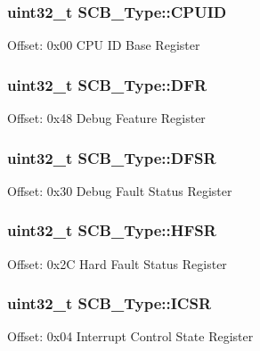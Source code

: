 \subsubsection[{\texorpdfstring{C\+P\+U\+ID}{CPUID}}]{ uint32\+\_\+t S\+C\+B\+\_\+\+Type\+::\+C\+P\+U\+ID}\hypertarget{structSCB__Type_afa7a9ee34dfa1da0b60b4525da285032}{}\label{structSCB__Type_afa7a9ee34dfa1da0b60b4525da285032}
Offset\+: 0x00 C\+PU ID Base Register 
\subsubsection[{\texorpdfstring{D\+FR}{DFR}}]{ uint32\+\_\+t S\+C\+B\+\_\+\+Type\+::\+D\+FR}\hypertarget{structSCB__Type_a586a5225467262b378c0f231ccc77f86}{}\label{structSCB__Type_a586a5225467262b378c0f231ccc77f86}
Offset\+: 0x48 Debug Feature Register 
\subsubsection[{\texorpdfstring{D\+F\+SR}{DFSR}}]{ uint32\+\_\+t S\+C\+B\+\_\+\+Type\+::\+D\+F\+SR}\hypertarget{structSCB__Type_ad7d61d9525fa9162579c3da0b87bff8d}{}\label{structSCB__Type_ad7d61d9525fa9162579c3da0b87bff8d}
Offset\+: 0x30 Debug Fault Status Register 
\subsubsection[{\texorpdfstring{H\+F\+SR}{HFSR}}]{ uint32\+\_\+t S\+C\+B\+\_\+\+Type\+::\+H\+F\+SR}\hypertarget{structSCB__Type_a7bed53391da4f66d8a2a236a839d4c3d}{}\label{structSCB__Type_a7bed53391da4f66d8a2a236a839d4c3d}
Offset\+: 0x2C Hard Fault Status Register 
\subsubsection[{\texorpdfstring{I\+C\+SR}{ICSR}}]{ uint32\+\_\+t S\+C\+B\+\_\+\+Type\+::\+I\+C\+SR}\hypertarget{structSCB__Type_a3e66570ab689d28aebefa7e84e85dc4a}{}\label{structSCB__Type_a3e66570ab689d28aebefa7e84e85dc4a}
Offset\+: 0x04 Interrupt Control State Register 

